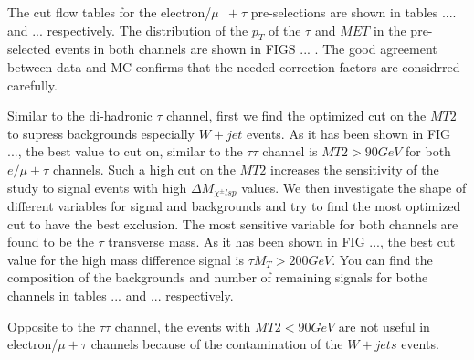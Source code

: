 The cut flow tables for the electron/$\mu$ $\,+\tau$ pre-selections are shown in tables .... and ... respectively. The distribution of the $p_{T}$ of the $\tau$ and $MET$ in the pre-selected events in both channels are shown in FIGS ... . The good agreement between data and MC confirms that the needed correction factors are considrred carefully.

Similar to the di-hadronic $\tau$ channel, first we find the optimized cut on the $MT2$ to supress backgrounds especially $W+jet$ events. As it has been shown in FIG ..., the best value to cut on, similar to the $\tau\tau$ channel is $MT2 > 90 GeV$ for both $e/\mu+\tau$ channels. Such a high cut on the $MT2$ increases the sensitivity of the study to signal events with high $\Delta M_{\chi^{\pm}lsp}$ values. We then investigate the shape of different variables for signal and backgrounds and try to find the most optimized cut to have the best exclusion. The most sensitive variable for both channels are found to be the $\tau$ transverse mass. As it has been shown in FIG ..., the best cut value for the high mass difference signal is $\tau M_{T} > 200 GeV$. You can find the composition of the backgrounds and number of remaining signals for bothe channels in tables ... and ... respectively.

Opposite to the $\tau\tau$ channel, the events with $MT2<90 GeV$ are not useful in electron/$\mu + \tau$ channels because of the contamination of the $W+jets$ events.
